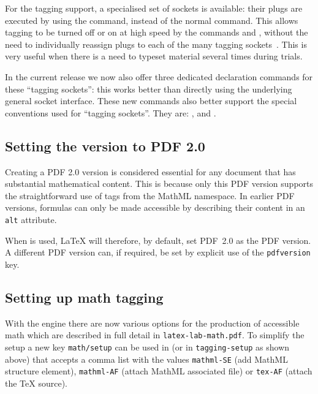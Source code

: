 \documentclass{ltnews}
\providecommand\LuaTeX{\hologo{LuaTeX}}
\begin{document}
For the tagging support, a specialised set of sockets is available: 
their plugs are executed
by using the   command, instead of the normal
 command. This allows tagging to be turned off or on at high
speed by the commands  and , without the need
to individually reassign plugs to each of the many tagging
sockets~\cite[p.\,97]{41:ltnews}. This is very useful 
when there is a need to typeset material several times during trials. 

In the current release we now also offer three dedicated declaration
commands for these \enquote{tagging sockets}: this works better than 
directly using the underlying general socket interface. 
These new commands also better support the
special conventions used for \enquote{tagging sockets}. They are:  
,  and
.


\subsection{Setting the version to PDF 2.0}

Creating a PDF 2.0 version is considered essential for any document that has 
substantial mathematical content.  This is because only this PDF version supports 
the straightforward use of tags from the 
MathML namespace.
%
In earlier PDF versions, formulas can only be made accessible by
describing their content in an \texttt{alt} attribute.
%

When  is used, \LaTeX{}
will therefore, by default, set PDF~2.0 as the PDF version.
A different PDF version can, if required, be set by explicit use of 
the \texttt{pdfversion} key.




\subsection{Setting up math tagging}

With the \LuaTeX{} engine there are now various options for the
production of accessible math which are described in full detail in
\texttt{latex-lab-math.pdf}. To simplify the setup a new key
\texttt{math/setup} can be used in  (or in
\texttt{tagging-setup} as shown above) that accepts a comma list with
the values \texttt{mathml-SE} (add MathML structure element),
\texttt{mathml-AF} (attach MathML associated file) or \texttt{tex-AF}
(attach the \TeX{} source).
\end{document}
